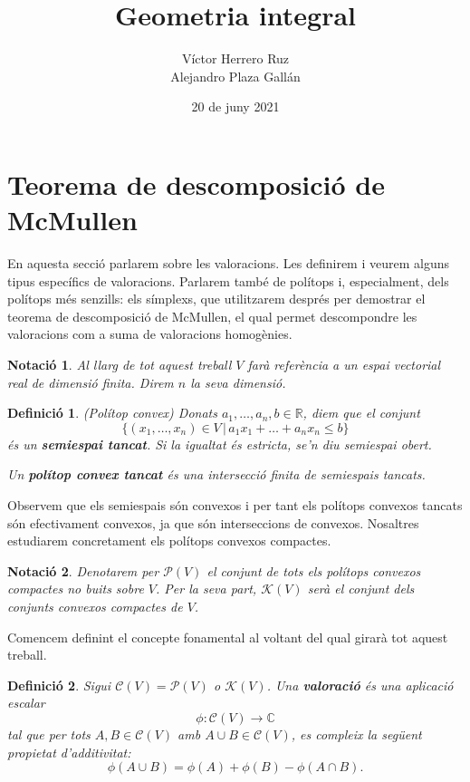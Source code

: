 \documentclass{article}
\title{Geometria integral}
\author{V\'{i}ctor Herrero Ruz\\Alejandro Plaza Gall\'{a}n}
\date{20 de juny 2021}
\newtheorem{definicio}{Definici\'{o}}
\newtheorem{notacio}{Notaci\'{o}}
\theoremstyle{definition}
\begin{document}
\maketitle

\section{Teorema de descomposici\'{o} de McMullen}

En aquesta secci\'{o} parlarem sobre les valoracions. Les definirem i veurem alguns tipus espec\'{i}fics de valoracions. Parlarem tamb\'{e} de pol\'{i}tops i, especialment, dels pol\'{i}tops m\'{e}s senzills: els s\'{i}mplexs, que utilitzarem despr\'{e}s per demostrar el teorema de descomposici\'{o} de McMullen, el qual permet descompondre les valoracions com a suma de valoracions homog\`{e}nies.

\begin{notacio}
Al llarg de tot aquest treball $V$ far\`{a} refer\`{e}ncia a un espai vectorial real de dimensi\'{o} finita. Direm $n$ la seva dimensi\'{o}.
\end{notacio}

\begin{definicio}
(Pol\'{i}top convex) Donats $a_1,\ldots,a_n,b\in\mathbb{R}$, diem que el conjunt
\[\{(x_1,\ldots,x_n)\in V\,|\,a_1x_1+\ldots+a_nx_n\leq b\}\]
\'{e}s un \textbf{semiespai tancat}. Si la igualtat \'{e}s estricta, se'n diu semiespai obert.

Un \textbf{pol\'{i}top convex tancat} \'{e}s una intersecci\'{o} finita de semiespais tancats.
\end{definicio}

Observem que els semiespais s\'{o}n convexos i per tant els pol\'{i}tops convexos tancats s\'{o}n efectivament convexos, ja que s\'{o}n interseccions de convexos. Nosaltres estudiarem concretament els pol\'{i}tops convexos compactes.

\begin{notacio}
Denotarem per $\mathcal{P}(V)$ el conjunt de tots els pol\'{i}tops convexos compactes no buits sobre $V$. Per la seva part, $\mathcal{K}(V)$ ser\`{a} el conjunt dels conjunts convexos compactes de $V$.
\end{notacio}

Comencem definint el concepte fonamental al voltant del qual girar\`{a} tot aquest treball.

\begin{definicio}
Sigui $\mathcal{C}(V)=\mathcal{P}(V)$ o $\mathcal{K}(V)$. Una \textbf{valoraci\'{o}} \'{e}s una aplicaci\'{o} escalar
\[\phi:\mathcal{C}(V)\longrightarrow\mathbb{C}\]
tal que per tots $A,B\in\mathcal{C}(V)$ amb $A\cup B\in\mathcal{C}(V)$, es compleix la seg\"{u}ent propietat d'additivitat:
\[\phi(A\cup B)=\phi(A)+\phi(B)-\phi(A\cap B).\]
\end{definicio}
\end{document}

